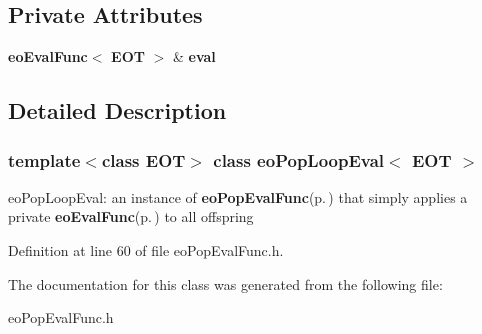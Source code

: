 \subsection*{Private Attributes}
\begin{CompactItemize}
\item 
{\bf eo\-Eval\-Func}$<$ {\bf EOT} $>$ \& {\bf eval}\label{classeo_pop_loop_eval_r0}

\end{CompactItemize}


\subsection{Detailed Description}
\subsubsection*{template$<$class EOT$>$ class eo\-Pop\-Loop\-Eval$<$ EOT $>$}

eo\-Pop\-Loop\-Eval: an instance of {\bf eo\-Pop\-Eval\-Func}{\rm (p.\,\pageref{classeo_pop_eval_func})} that simply applies a private {\bf eo\-Eval\-Func}{\rm (p.\,\pageref{classeo_eval_func})} to all offspring 



Definition at line 60 of file eo\-Pop\-Eval\-Func.h.

The documentation for this class was generated from the following file:\begin{CompactItemize}
\item 
eo\-Pop\-Eval\-Func.h\end{CompactItemize}
